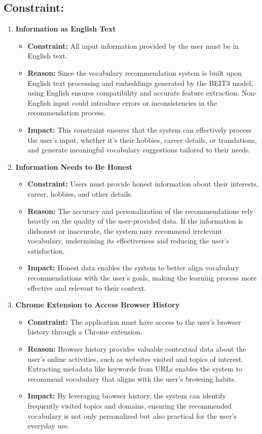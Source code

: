 \documentclass{article}
\begin{document}
\subsection{Constraint:}
\begin{enumerate}
    \item \textbf{Information as English Text}  
    \begin{itemize}
        \item \textbf{Constraint:} All input information provided by the user must be in English text.
        \item \textbf{Reason:} Since the vocabulary recommendation system is built upon English text processing and embeddings generated by the BEIT3 model, using English ensures compatibility and accurate feature extraction. Non-English input could introduce errors or inconsistencies in the recommendation process.
        \item \textbf{Impact:} This constraint ensures that the system can effectively process the user’s input, whether it’s their hobbies, career details, or translations, and generate meaningful vocabulary suggestions tailored to their needs.
    \end{itemize}
    
    \item \textbf{Information Needs to Be Honest}  
    \begin{itemize}
        \item \textbf{Constraint:} Users must provide honest information about their interests, career, hobbies, and other details.
        \item \textbf{Reason:} The accuracy and personalization of the recommendations rely heavily on the quality of the user-provided data. If the information is dishonest or inaccurate, the system may recommend irrelevant vocabulary, undermining its effectiveness and reducing the user’s satisfaction.
        \item \textbf{Impact:} Honest data enables the system to better align vocabulary recommendations with the user’s goals, making the learning process more effective and relevant to their context.
    \end{itemize}
    
    \item \textbf{Chrome Extension to Access Browser History}  
    \begin{itemize}
        \item \textbf{Constraint:} The application must have access to the user’s browser history through a Chrome extension.
        \item \textbf{Reason:} Browser history provides valuable contextual data about the user’s online activities, such as websites visited and topics of interest. Extracting metadata like keywords from URLs enables the system to recommend vocabulary that aligns with the user’s browsing habits.
        \item \textbf{Impact:} By leveraging browser history, the system can identify frequently visited topics and domains, ensuring the recommended vocabulary is not only personalized but also practical for the user’s everyday use.
    \end{itemize}
\end{enumerate}
\end{document}
